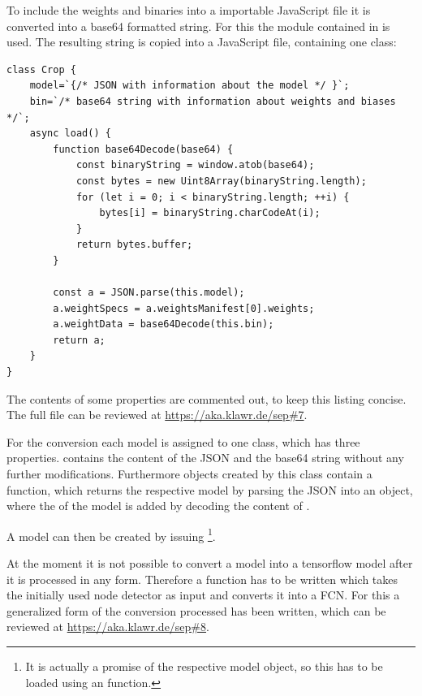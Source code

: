 To include the weights and binaries into a importable JavaScript file it is converted into a base64 formatted string.
For this the  \cite{Josefsson2018} module contained in  is used.
The resulting string is copied into a JavaScript file, containing one class:

\begin{lstlisting}
class Crop {
    model=`{/* JSON with information about the model */ }`;
    bin=`/* base64 string with information about weights and biases */`;
    async load() {
        function base64Decode(base64) {
            const binaryString = window.atob(base64);
            const bytes = new Uint8Array(binaryString.length);
            for (let i = 0; i < binaryString.length; ++i) {
                bytes[i] = binaryString.charCodeAt(i);
            }
            return bytes.buffer;
        }
    
        const a = JSON.parse(this.model);
        a.weightSpecs = a.weightsManifest[0].weights;
        a.weightData = base64Decode(this.bin);
        return a;
    }
}
\end{lstlisting}

The contents of some properties are commented out, to keep this listing concise.
The full file can be reviewed at \url{https://aka.klawr.de/sep\#7}. %

For the conversion each model is assigned to one class, which has three properties.
 contains the content of the JSON and  the base64 string without any further modifications.
Furthermore objects created by this class contain a  function, which returns the respective model by parsing the JSON into an object, where the  of the model is added by decoding the content of .

A model can then be created by issuing \footnote{It is actually a promise of the respective model object, so this has to be loaded using an  function.}.

At the moment it is not possible to convert a model into a tensorflow model after it is processed in any form.
Therefore a function has to be written which takes the initially used node detector as input and converts it into a FCN.
For this a generalized form of the conversion processed has been written, which can be reviewed at \url{https://aka.klawr.de/sep\#8}. %


